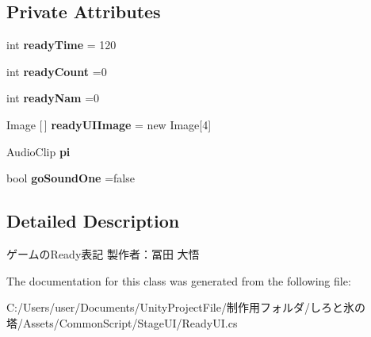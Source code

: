 \subsection*{Private Attributes}
\begin{DoxyCompactItemize}
\item 
\mbox{\label{class_ready_u_i_a1b207e507182e019debbaf2a85057727}} 
int {\bfseries ready\+Time} = 120
\item 
\mbox{\label{class_ready_u_i_ab41e8d63fce0a232164a478c92d73f27}} 
int {\bfseries ready\+Count} =0
\item 
\mbox{\label{class_ready_u_i_a7fb6b6f96c598a58e367d25c60e6e767}} 
int {\bfseries ready\+Nam} =0
\item 
\mbox{\label{class_ready_u_i_a476bf238d1ac7ff2547dc4ea9da767f0}} 
Image \mbox{[}$\,$\mbox{]} {\bfseries ready\+U\+I\+Image} = new Image\mbox{[}4\mbox{]}
\item 
\mbox{\label{class_ready_u_i_a6815ede43ff71801314a8198131f56d9}} 
Audio\+Clip {\bfseries pi}
\item 
\mbox{\label{class_ready_u_i_a28ab9e2167182164cb7365c9e7fd7496}} 
bool {\bfseries go\+Sound\+One} =false
\end{DoxyCompactItemize}


\subsection{Detailed Description}
ゲームの\+Ready表記 製作者：冨田 大悟 



The documentation for this class was generated from the following file\+:\begin{DoxyCompactItemize}
\item 
C\+:/\+Users/user/\+Documents/\+Unity\+Project\+File/制作用フォルダ/しろと氷の塔/\+Assets/\+Common\+Script/\+Stage\+U\+I/Ready\+U\+I.\+cs\end{DoxyCompactItemize}

